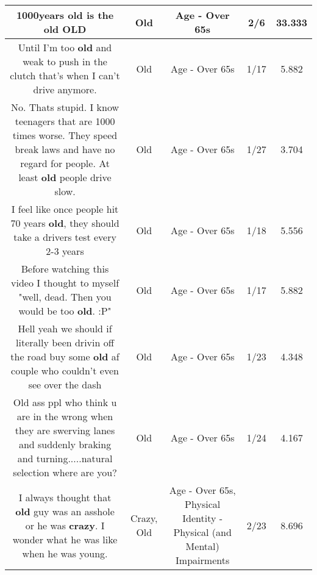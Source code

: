 \documentclass[11pt]{article}
\newlength\mylength
\begin{document}
\begin{center}
\begin{longtable}{|C{.65\mylength}|C{.30\mylength}|C{.12\mylength}|C{.12\mylength}|C{.12\mylength}|}
  \small 1000years \textbf{old} is the \textbf{old} OLD\normalsize   & Old & Age - Over 65s & 2/6 & 33.333 \\  \hline
  \small Until I'm too \textbf{old} and weak to push in the clutch that's when I can't drive anymore.\normalsize   & Old & Age - Over 65s & 1/17 & 5.882 \\  \hline
  \small No. Thats stupid. I know teenagers that are 1000 times worse. They speed break laws and have no regard for people. At least \textbf{old} people drive slow.\normalsize   & Old & Age - Over 65s & 1/27 & 3.704 \\  \hline
  \small I feel like once people hit 70 years \textbf{old}, they should take a drivers test every 2-3 years\normalsize   & Old & Age - Over 65s & 1/18 & 5.556 \\  \hline
  \small Before watching this video I thought to myself "well, dead. Then you would be too \textbf{old}. :P"\normalsize   & Old & Age - Over 65s & 1/17 & 5.882 \\  \hline
  \small Hell yeah we should if literally been drivin off the road buy some \textbf{old} af couple who couldn't even see over the dash\normalsize   & Old & Age - Over 65s & 1/23 & 4.348 \\  \hline
  \small Old ass ppl who think u are in the wrong when they are swerving lanes and suddenly braking and turning.....natural selection where are you?\normalsize   & Old & Age - Over 65s & 1/24 & 4.167 \\  \hline
  \small I always thought that \textbf{old} guy was an asshole or he was \textbf{crazy}. I wonder what he was like when he was young.\normalsize   & Crazy, Old & Age - Over 65s, Physical Identity - Physical (and Mental) Impairments & 2/23 & 8.696 \\  \hline

\end{longtable}
\end{center}
\end{document}
